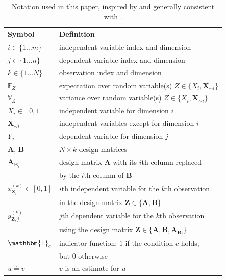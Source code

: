 \documentclass[12pt]{article}
\begin{document}
\begin{table}
    \centering
    \begin{tabular}{ll}
        Symbol & Definition \\
        \hline
        $i \in \{1 \ldots m\}$ & independent-variable index and dimension \\
        $j \in \{1 \ldots n\}$ & dependent-variable index and dimension \\
        $k \in \{1 \ldots N\}$ & observation index and dimension \\
        $\mathbb{E}_Z$ & expectation over random variable(s) $Z \in \{ X_i, \mathbf{X}_{\sim i} \}$ \\
        $\mathbb{V}_Z$ & variance over random variable(s) $Z \in \{ X_i, \mathbf{X}_{\sim i} \}$ \\
        $X_i \in [0, 1]$ & independent variable for dimension $i$ \\
        $\mathbf{X}_{\sim i}$ & independent variables except for dimension $i$ \\
        $Y_j$ & dependent variable for dimension $j$ \\
        $\mathbf{A}$, $\mathbf{B}$ & $N \times k$ design matrices \\
        $\mathbf{A}_{\mathbf{B}_i}$ & design matrix $\mathbf{A}$ with its $i$th column replaced \\ & by the $i$th column of $\mathbf{B}$ \\
        $x_{\mathbf{Z}_i}^{(k)} \in [0, 1]$ & $i$th independent variable for the $k$th observation \\ & in the design matrix $\mathbf{Z} \in \{ \mathbf{A}, \mathbf{B} \}$ \\
        $y_{\mathbf{Z},j}^{(k)}$ & $j$th dependent variable for the $k$th observation \\ & using the design matrix $\mathbf{Z} \in \{ \mathbf{A}, \mathbf{B}, \mathbf{A}_{\mathbf{B}_i} \}$ \\
        $\mathbbm{1}_c$ & indicator function: $1$ if the condition $c$ holds, \\ & but $0$ otherwise \\
        $u \mathrel{\hat=} v$ & $v$ is an estimate for $u$ \\
    \end{tabular}
    \caption{Notation used in this paper, inspired by and generally consistent with \cite{saltelli_variance_2010}.}
    \label{tab:notation}
\end{table}
\end{document}
